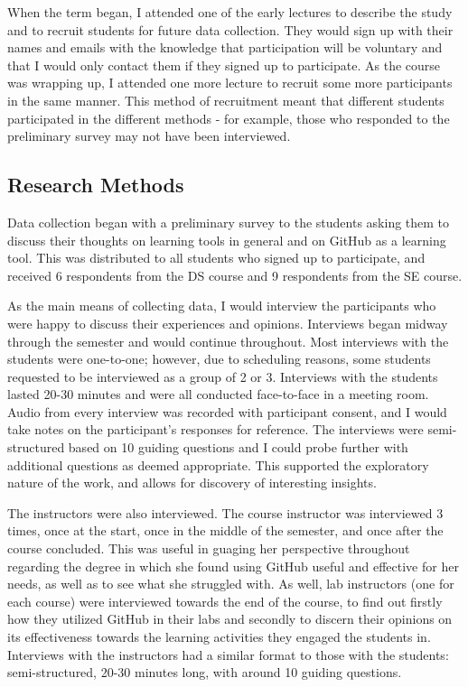 When the term began, I attended one of the early lectures to describe the study and to recruit students for future data collection. They would sign up with their names and emails with the knowledge that participation will be voluntary and that I would only contact them if they signed up to participate. As the course was wrapping up, I attended one more lecture to recruit some more participants in the same manner. This method of recruitment meant that different students participated in the different methods - for example, those who responded to the preliminary survey may not have been interviewed.

\subsection{Research Methods}
Data collection began with a preliminary survey to the students asking them to discuss their thoughts on learning tools in general and on GitHub as a learning tool. This was distributed to all students who signed up to participate, and received 6 respondents from the DS course and 9 respondents from the SE course.

As the main means of collecting data, I would interview the participants who were happy to discuss their experiences and opinions. Interviews began midway through the semester and would continue throughout. Most interviews with the students were one-to-one; however, due to scheduling reasons, some students requested to be interviewed as a group of 2 or 3. Interviews with the students lasted 20-30 minutes and were all conducted face-to-face in a meeting room. Audio from every interview was recorded with participant consent, and I would take notes on the participant's responses for reference. The interviews were semi-structured based on 10 guiding questions and I could probe further with additional questions as deemed appropriate. This supported the exploratory nature of the work, and allows for discovery of interesting insights.

The instructors were also interviewed. The course instructor was interviewed 3 times, once at the start, once in the middle of the semester, and once after the course concluded. This was useful in guaging her perspective throughout regarding the degree in which she found using GitHub useful and effective for her needs, as well as to see what she struggled with. As well, lab instructors (one for each course) were interviewed towards the end of the course, to find out firstly how they utilized GitHub in their labs and secondly to discern their opinions on its effectiveness towards the learning activities they engaged the students in. Interviews with the instructors had a similar format to those with the students: semi-structured, 20-30 minutes long, with around 10 guiding questions.

